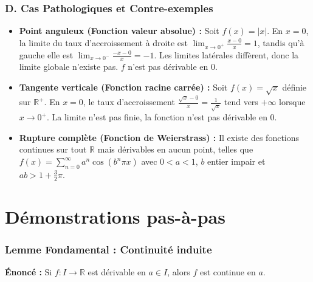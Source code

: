 \documentclass[11pt,a4paper]{article}
\begin{document}
\subsubsection*{D. Cas Pathologiques et Contre-exemples}

\begin{itemize}
\item \textbf{Point anguleux (Fonction valeur absolue) :} Soit $f(x) = |x|$. En $x = 0$, la limite du taux d'accroissement à droite est $\lim_{x \to 0^+} \frac{x - 0}{x} = 1$, tandis qu'à gauche elle est $\lim_{x \to 0^-} \frac{-x - 0}{x} = -1$. Les limites latérales diffèrent, donc la limite globale n'existe pas. $f$ n'est pas dérivable en $0$.
\item \textbf{Tangente verticale (Fonction racine carrée) :} Soit $f(x) = \sqrt{x}$ définie sur $\mathbb{R}^+$. En $x = 0$, le taux d'accroissement $\frac{\sqrt{x} - 0}{x} = \frac{1}{\sqrt{x}}$ tend vers $+\infty$ lorsque $x \to 0^+$. La limite n'est pas finie, la fonction n'est pas dérivable en $0$.
\item \textbf{Rupture complète (Fonction de Weierstrass) :} Il existe des fonctions continues sur tout $\mathbb{R}$ mais dérivables en aucun point, telles que $f(x) = \sum_{n=0}^{\infty} a^n \cos(b^n \pi x)$ avec $0 < a < 1$, $b$ entier impair et $ab > 1 + \frac{3}{2}\pi$.
\end{itemize}



\section{Démonstrations pas-à-pas}


\subsubsection*{Lemme Fondamental : Continuité induite}
\textbf{Énoncé :} Si $f : I \to \mathbb{R}$ est dérivable en $a \in I$, alors $f$ est continue en $a$.
\end{document}
